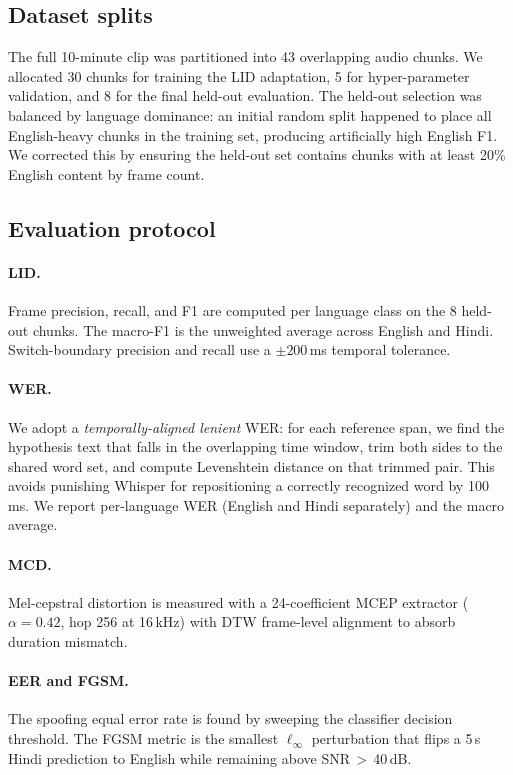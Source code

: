 \documentclass[10pt,twocolumn,letterpaper]{article}
\begin{document}
\subsection{Dataset splits}
\label{sec:splits}
The full 10-minute clip was partitioned into 43 overlapping audio
chunks.  We allocated 30 chunks for training the LID adaptation,
5 for hyper-parameter validation, and 8 for the final held-out
evaluation.  The held-out selection was balanced by language
dominance: an initial random split happened to place all English-heavy
chunks in the training set, producing artificially high English F1.
We corrected this by ensuring the held-out set contains chunks with
at least 20\% English content by frame count.

\subsection{Evaluation protocol}
\paragraph{LID.}
Frame precision, recall, and F1 are computed per language class on
the 8 held-out chunks.  The macro-F1 is the unweighted average across
English and Hindi.  Switch-boundary precision and recall use a
$\pm 200$\,ms temporal tolerance.

\paragraph{WER.}
We adopt a \emph{temporally-aligned lenient} WER: for each reference
span, we find the hypothesis text that falls in the overlapping time
window, trim both sides to the shared word set, and compute Levenshtein
distance on that trimmed pair.  This avoids punishing Whisper for
repositioning a correctly recognized word by 100\,ms.  We report
per-language WER (English and Hindi separately) and the macro average.

\paragraph{MCD.}
Mel-cepstral distortion is measured with a 24-coefficient MCEP
extractor ($\alpha=0.42$, hop 256 at 16\,kHz) with DTW frame-level
alignment to absorb duration mismatch.

\paragraph{EER and FGSM.}
The spoofing equal error rate is found by sweeping the classifier
decision threshold.  The FGSM metric is the smallest
$\ell_\infty$ perturbation that flips a 5\,s Hindi prediction to
English while remaining above SNR\,$>$\,40\,dB.
\end{document}
